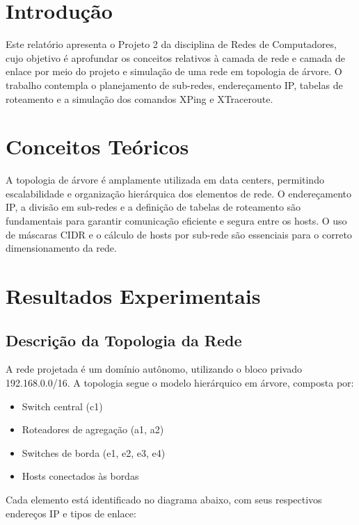 \documentclass[conference,compsoc]{IEEEtran}
\begin{document}
\begin{otherlanguage}{brazil}

\section{Introdução}

Este relatório apresenta o Projeto 2 da disciplina de Redes de Computadores, cujo objetivo é aprofundar os conceitos relativos à camada de rede e camada de enlace por meio do projeto e simulação de uma rede em topologia de árvore. O trabalho contempla o planejamento de sub-redes, endereçamento IP, tabelas de roteamento e a simulação dos comandos XPing e XTraceroute.

\section{Conceitos Teóricos}

A topologia de árvore é amplamente utilizada em data centers, permitindo escalabilidade e organização hierárquica dos elementos de rede. O endereçamento IP, a divisão em sub-redes e a definição de tabelas de roteamento são fundamentais para garantir comunicação eficiente e segura entre os hosts. O uso de máscaras CIDR e o cálculo de hosts por sub-rede são essenciais para o correto dimensionamento da rede.

\section{Resultados Experimentais}

\subsection{Descrição da Topologia da Rede}

A rede projetada é um domínio autônomo, utilizando o bloco privado 192.168.0.0/16. A topologia segue o modelo hierárquico em árvore, composta por:
\begin{itemize}
    \item Switch central (c1)
    \item Roteadores de agregação (a1, a2)
    \item Switches de borda (e1, e2, e3, e4)
    \item Hosts conectados às bordas
\end{itemize}

Cada elemento está identificado no diagrama abaixo, com seus respectivos endereços IP e tipos de enlace:


\end{otherlanguage}
\end{document}
